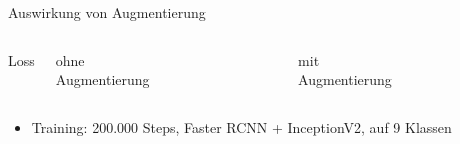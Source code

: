 \begin{frame}{Auswirkung von Augmentierung}

    \begin{columns}[T]
        \vspace{1.5cm}
        Loss\\
        \vspace{3cm}

        \centering
        ohne Augmentierung
        \begin{figure}
            \centering
            \def\svgwidth{0.75\columnwidth}
            \footnotesize
            
        \end{figure}


        \centering
        mit Augmentierung

        \begin{figure}
            \centering
            \def\svgwidth{0.75\columnwidth}
            \footnotesize
            
        \end{figure}

    \end{columns}
    \begin{itemize}
        \fontsize{7pt}{8pt}\selectfont
        \item Training: 200.000 Steps, Faster RCNN + InceptionV2, auf 9 Klassen
    \end{itemize}
\end{frame}
